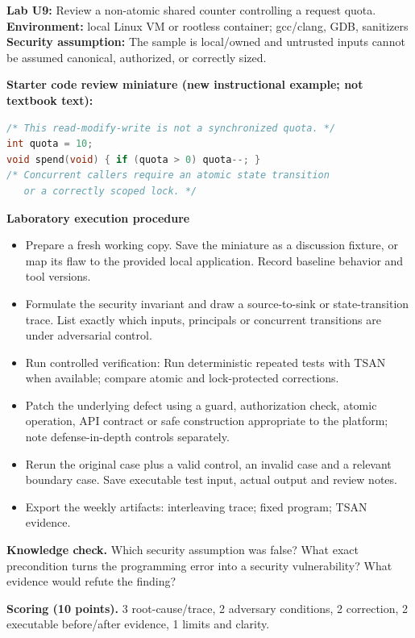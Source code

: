 \documentclass[10pt,letterpaper]{article}
\begin{document}
\begin{insight}\textbf{Lab U9:} Review a non-atomic shared counter controlling a request quota.\\\textbf{Environment:} local Linux VM or rootless container; gcc/clang, GDB, sanitizers\\\textbf{Security assumption:} The sample is local/owned and untrusted inputs cannot be assumed canonical, authorized, or correctly sized.\end{insight}
\textbf{Starter code review miniature (new instructional example; not textbook text):}
\begin{lstlisting}[language=C]
/* This read-modify-write is not a synchronized quota. */
int quota = 10;
void spend(void) { if (quota > 0) quota--; }
/* Concurrent callers require an atomic state transition
   or a correctly scoped lock. */
\end{lstlisting}
\textbf{Laboratory execution procedure}
\begin{itemize}[leftmargin=*,itemsep=2pt]
\item Prepare a fresh working copy. Save the miniature as a discussion fixture, or map its flaw to the provided local application. Record baseline behavior and tool versions.
\item Formulate the security invariant and draw a source-to-sink or state-transition trace. List exactly which inputs, principals or concurrent transitions are under adversarial control.
\item Run controlled verification: Run deterministic repeated tests with TSAN when available; compare atomic and lock-protected corrections.
\item Patch the underlying defect using a guard, authorization check, atomic operation, API contract or safe construction appropriate to the platform; note defense-in-depth controls separately.
\item Rerun the original case plus a valid control, an invalid case and a relevant boundary case. Save executable test input, actual output and review notes.
\item Export the weekly artifacts: interleaving trace; fixed program; TSAN evidence.
\end{itemize}
\textbf{Knowledge check.} Which security assumption was false? What exact precondition turns the programming error into a security vulnerability? What evidence would refute the finding?

\textbf{Scoring (10 points).} 3 root-cause/trace, 2 adversary conditions, 2 correction, 2 executable before/after evidence, 1 limits and clarity.
\end{document}
